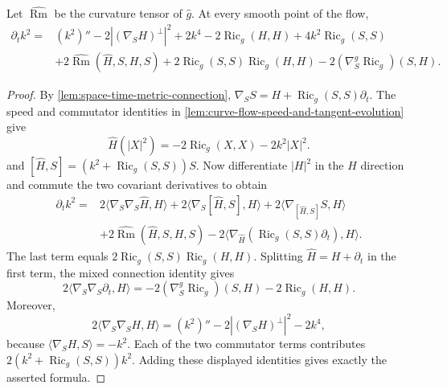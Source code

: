 \begin{theorem}
\label{thm:curve-flow-curvature-evolution}
\notready
Let $\widehat{\operatorname{Rm}}$ be the curvature
tensor of $\widehat g$.  At every smooth point of the flow,
\begin{align*}
 \partial_t k^2={}&(k^2)''-2| (\nabla_SH)^\perp|^2+2k^4
 -2\operatorname{Ric}_g(H,H)+4k^2\operatorname{Ric}_g(S,S)\\
 &+2\widehat{\operatorname{Rm}}(\widehat H,S,H,S)
 +2\operatorname{Ric}_g(S,S)\operatorname{Ric}_g(H,H)
 -2(\nabla^g_S\operatorname{Ric}_g)(S,H).
\end{align*}
\end{theorem}
\begin{proof}
By \ref{lem:space-time-metric-connection},
$\nabla_SS=H+\operatorname{Ric}_g(S,S)\partial_t$.  The speed and commutator
identities in \ref{lem:curve-flow-speed-and-tangent-evolution} give
\[
 \widehat H(|X|^2)=-2\operatorname{Ric}_g(X,X)-2k^2|X|^2.
\]
and $[\widehat H,S]=(k^2+\operatorname{Ric}_g(S,S))S$.  Now differentiate
$|H|^2$ in the $\widehat H$ direction and commute the two covariant
derivatives to obtain
\begin{align*}
 \partial_tk^2={}&2\langle\nabla_S\nabla_S\widehat H,H\rangle
 +2\langle\nabla_S[\widehat H,S],H\rangle
 +2\langle\nabla_{[\widehat H,S]}S,H\rangle\\
 &+2\widehat{\operatorname{Rm}}(\widehat H,S,H,S)
 -2\langle\nabla_{\widehat H}
  (\operatorname{Ric}_g(S,S)\partial_t),H\rangle .
\end{align*}
The last term equals
$2\operatorname{Ric}_g(S,S)\operatorname{Ric}_g(H,H)$.  Splitting
$\widehat H=H+\partial_t$ in the first term, the mixed connection identity
gives
\[
 2\langle\nabla_S\nabla_S\partial_t,H\rangle
 =-2(\nabla^g_S\operatorname{Ric}_g)(S,H)
  -2\operatorname{Ric}_g(H,H).
\]
Moreover,
\[
 2\langle\nabla_S\nabla_SH,H\rangle
 =(k^2)''-2|(\nabla_SH)^\perp|^2-2k^4,
\]
because $\langle\nabla_SH,S\rangle=-k^2$.  Each of the two commutator
terms contributes
$2(k^2+\operatorname{Ric}_g(S,S))k^2$.  Adding these displayed
identities gives exactly the asserted formula.
\end{proof}

